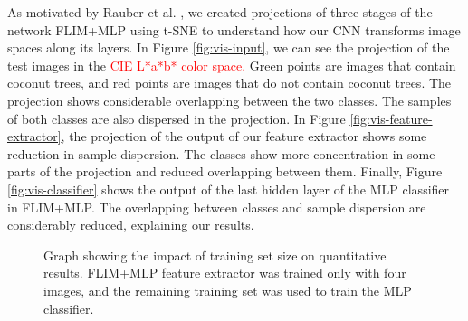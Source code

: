 \documentclass[journal, twoside]{IEEEtran}
\begin{document}
As motivated by Rauber et al. \cite{rauber2016visualizing}, we created projections of three stages of the network FLIM+MLP using t-SNE \cite{maaten2008visualizing} to understand how our CNN transforms image spaces along its layers. In Figure \ref{fig:vis-input}, we can see the projection of the test images in the \textcolor{red}{CIE L*a*b* color space.} Green points are images that contain coconut trees, and red points are images that do not contain coconut trees. The projection shows considerable overlapping between the two classes. The samples of both classes are also dispersed in the projection. In Figure \ref{fig:vis-feature-extractor}, the projection of the output of our feature extractor shows some reduction in sample dispersion. The classes show more concentration in some parts of the projection and reduced overlapping between them. Finally, Figure \ref{fig:vis-classifier} shows the output of the last hidden layer of the MLP classifier in FLIM+MLP. The overlapping between classes and sample dispersion are considerably reduced, explaining our results.





\begin{figure}
\caption{Graph showing the impact of training set size on quantitative results. FLIM+MLP feature extractor was trained only with four images, and the remaining training set was used to train the MLP classifier.}
\end{figure}
\end{document}
